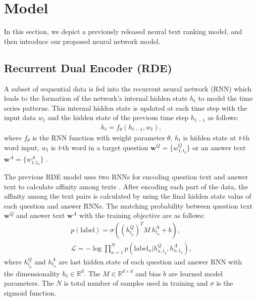 \documentclass[11pt,a4paper]{article}
\begin{document}
\section{Model}
\label{model}
In this section, we depict a previously released neural text ranking model, and then introduce our proposed neural network model.


\subsection{Recurrent Dual Encoder (RDE)}
A subset of sequential data is fed into the recurrent neural network (RNN) which leads to the formation of the network's internal hidden state $h_{t}$ to model the time series patterns. This internal hidden state is updated at each time step with the input data $w_{t}$ and the hidden state of the previous time step $h_{t-1}$ as follows:  
\begin{equation}
\begin{aligned}
& h_t = f_{\theta}(h_{t-1}, w_t),
\end{aligned}
\end{equation}
where $f_{\theta}$ is the RNN function with weight parameter $\theta$, $h_t$ is hidden state at \textit{t}-th word input, $w_t$ is \textit{t}-th word in a target question $\boldsymbol{w}^Q={\{w^Q_{1:t_q}\}}$ or an answer text $\boldsymbol{w}^A={\{w^A_{1:t_a}\}}$ . 

The previous RDE model uses two RNNs for encoding question text and answer text to calculate affinity among texts \cite{lowe2015ubuntu}.
After encoding each part of the data, the affinity among the text pairs is calculated by using the final hidden state value of each question and answer RNNs. 
The matching probability between question text $\boldsymbol{w}^Q$ and answer text $\boldsymbol{w}^A$ with the training objective are as follows:
\begin{equation}
\begin{aligned}
& p(\text{label}) = \sigma ( ({h_{t_q}^Q})^T M~h_{t_a}^A + b ), \\
& \mathcal{L} = -\log \prod_{n=1}^{N} p(\text{label}_n | h_{n,t_q}^Q, h_{n,t_a}^A),
\end{aligned}
\label{eq_de_loss}
\end{equation}
where $h_{t_q}^Q$ and $h_{t_a}^A$ are last hidden state of each question and answer RNN with the dimensionality $h_{t} \in \mathbb{R}^d$. The $M \in \mathbb{R}^{d \times d}$ and bias $b$ are learned model parameters. The $N$ is total number of samples used in training and $\sigma$ is the sigmoid function. 
\end{document}
